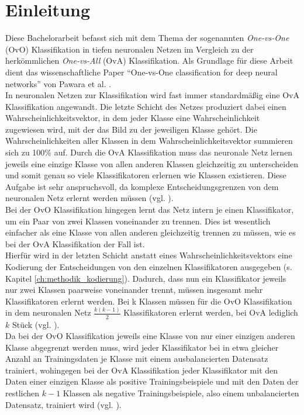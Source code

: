 \chapter{Einleitung}
\label{ch:einleitung}



Diese Bachelorarbeit befasst sich mit dem Thema der sogenannten \textit{One-vs-One} (OvO) Klassifikation in tiefen neuronalen Netzen im Vergleich zu der herkömmlichen \textit{One-vs-All} (OvA) Klassifikation. Als Grundlage für diese Arbeit dient das wissenschaftliche Paper \enquote{One-vs-One classification for deep neural networks} von Pawara et al. \cite{pawaraPaper}.\\

In neuronalen Netzen zur Klassifikation wird fast immer standardmäßig eine OvA Klassifikation angewandt. Die letzte Schicht des Netzes produziert dabei einen Wahrscheinlichkeitsvektor, in dem jeder Klasse eine Wahrscheinlichkeit zugewiesen wird, mit der das Bild zu der jeweiligen Klasse gehört. Die Wahrscheinlichkeiten aller Klassen in dem Wahrscheinlichkeitsvektor summieren sich zu 100\% auf. Durch die OvA Klassifikation muss das neuronale Netz lernen jeweils eine einzige Klasse von allen anderen Klassen gleichzeitig zu unterscheiden und somit genau so viele Klassifikatoren erlernen wie Klassen existieren. Diese Aufgabe ist sehr anspruchsvoll, da komplexe Entscheidungsgrenzen von dem neuronalen Netz erlernt werden müssen (vgl. \cite{pawaraPaper}).\\

Bei der OvO Klassifikation hingegen lernt das Netz intern je einen Klassifikator, um ein Paar von zwei Klassen voneinander zu trennen. Dies ist wesentlich einfacher als eine Klasse von allen anderen gleichzeitig trennen zu müssen, wie es bei der OvA Klassifikation der Fall ist.\\

Hierfür wird in der letzten Schicht anstatt eines Wahrscheinlichkeitsvektors eine Kodierung der Entscheidungen von den einzelnen Klassifikatoren ausgegeben (s. Kapitel \ref{ch:methodik_kodierung}).
Dadurch, dass nun ein Klassifikator jeweils nur zwei Klassen paarweise voneinander trennt, müssen insgesamt mehr Klassifikatoren erlernt werden.
Bei k Klassen müssen für die OvO Klassifikation in dem neuronalen Netz $\frac{k(k-1)}{2}$ Klassifikatoren erlernt werden, bei OvA lediglich $k$ Stück (vgl. \cite{pawaraPaper}).\\

Da bei der OvO Klassifikation jeweils eine Klasse von nur einer einzigen anderen Klasse abgegrenzt werden muss, wird jeder Klassifikator bei in etwa gleicher Anzahl an Trainingsdaten je Klasse mit einem ausbalancierten Datensatz trainiert, wohingegen bei der OvA Klassifikation jeder Klassifikator mit den Daten einer einzigen Klasse als positive Trainingsbeispiele und mit den Daten der restlichen $k-1$ Klassen als negative Trainingsbeispiele, also einem unbalancierten Datensatz, trainiert wird (vgl. \cite{pawaraPaper}).\\

